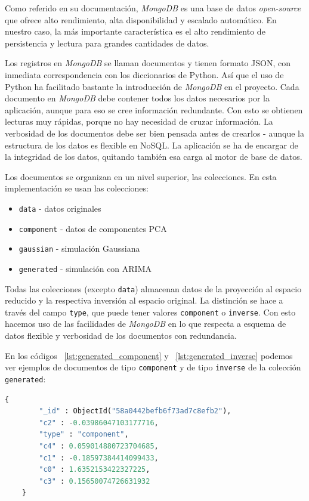 \documentclass[11pt,spanish,listoffigures,listoftables]{tfgetsinf}
\begin{document}
        Como referido en su documentación, {\em MongoDB} es una base de datos {\em open-source} que ofrece alto rendimiento, alta disponibilidad y escalado automático. En nuestro caso, la más importante característica es el alto rendimiento de persistencia y lectura para grandes cantidades de datos. 
        
        Los registros en {\em MongoDB} se llaman documentos y tienen formato JSON, con inmediata correspondencia con los diccionarios de Python. Así que el uso de Python ha facilitado bastante la introducción de {\em MongoDB} en el proyecto. Cada documento en {\em MongoDB} debe contener todos los datos necesarios por la aplicación, aunque para eso se cree información redundante. Con esto se obtienen lecturas muy rápidas, porque no hay necesidad de cruzar información. La verbosidad de los documentos debe ser bien pensada antes de crearlos - aunque la estructura de los datos es flexible en NoSQL. La aplicación se ha de encargar de la integridad de los datos, quitando también esa carga al motor de base de datos.
        
        Los documentos se organizan en un nivel superior, las colecciones. En esta implementación se usan las colecciones:
        \begin{itemize}
        \item {\tt data} - datos originales
        \item {\tt component} - datos de componentes PCA
        \item {\tt gaussian} - simulación Gaussiana
        \item {\tt generated} - simulación con ARIMA
        \end{itemize}
        
        Todas las colecciones (excepto {\tt data}) almacenan datos de la proyección al espacio reducido y la respectiva inversión al espacio original. La distinción se hace a través del campo {\tt type}, que puede tener valores {\tt component} o {\tt inverse}. Con esto hacemos uso de las facilidades de {\em MongoDB} en lo que respecta a esquema de datos flexible y verbosidad de los documentos con redundancia. 
        
        En los códigos ~\ref{lst:generated_component} y ~\ref{lst:generated_inverse} podemos ver ejemplos de documentos de tipo {\tt component} y de tipo {\tt inverse} de la colección {\tt generated}:
        
        \begin{lstlisting}[language=Python, caption=Documento de tipo {\tt component}., label={lst:generated_component}]
    {
        "_id" : ObjectId("58a0442befb6f73ad7c8efb2"),
        "c2" : -0.03986047103177716,
        "type" : "component",
        "c4" : 0.059014880723704685,
        "c1" : -0.18597384414099433,
        "c0" : 1.6352153422327225,
        "c3" : 0.15650074726631932
    }
        \end{lstlisting}
\end{document}
